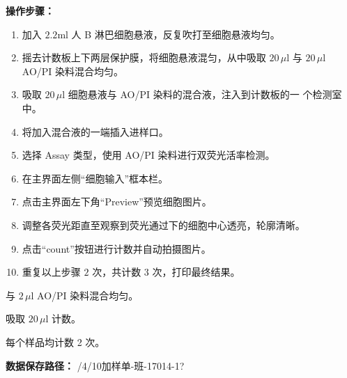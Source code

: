 \documentclass[UTF8,10pt,a4paper,fontset=fandol]{ctexart}
\newcommand{\fieldvalue}[1]{#1}
\newcommand{\handwritten}[1]{#1}
\begin{document}
\medskip

\noindent
\textbf{操作步骤：}

\begin{enumerate}
    \item 加入 $2.2\mathrm{ml}$ 人 B 淋巴细胞悬液，反复吹打至细胞悬液均匀。
    \item 摇去计数板上下两层保护膜，将细胞悬液混匀，从中吸取 $20\,\mu\mathrm{l}$ 与 $20\,\mu\mathrm{l}$ AO/PI 染料混合均匀。
    \item 吸取 $20\,\mu\mathrm{l}$ 细胞悬液与 AO/PI 染料的混合液，注入到计数板的一
    个检测室中。
    \item 将加入混合液的一端插入进样口。
    \item 选择 Assay 类型，使用 AO/PI 染料进行双荧光活率检测。
    \item 在主界面左侧“细胞输入”框本栏。
    \item 点击主界面左下角“Preview”预览细胞图片。
    \item 调整各荧光距直至观察到荧光通过下的细胞中心透亮，轮廓清晰。
    \item 点击“count”按钮进行计数并自动拍摄图片。
    \item 重复以上步骤 $2$ 次，共计数 $3$ 次，打印最终结果。
\end{enumerate}

\noindent
与
$\fieldvalue{\handwritten{2\,\mu\mathrm{l}}}$
AO/PI 染料混合均匀。

\noindent
吸取
$\fieldvalue{\handwritten{20\,\mu\mathrm{l}}}$
计数。

\noindent
每个样品均计数
\fieldvalue{\handwritten{2}}
次。

\medskip

\noindent
\textbf{数据保存路径：}
\fieldvalue{\handwritten{/4/10加样单-班-17014-1?}}
\end{document}
